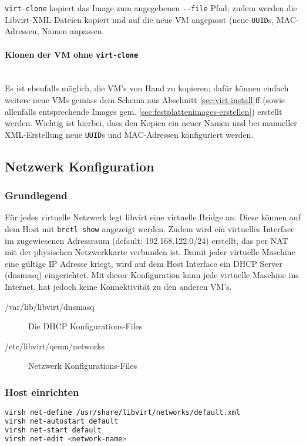 \lstinline|virt-clone| kopiert das Image zum angegebenen \lstinline|--file| Pfad; zudem werden die Libvirt-XML-Dateien kopiert und auf die neue VM angepasst (neue \lstinline|UUID|s, MAC-Adressen, Namen anpassen.

\paragraph{Klonen der VM ohne \lstinline|virt-clone|} \hfill \\
Es ist ebenfalls möglich, die VM's von Hand zu kopieren; dafür können einfach weitere neue VMs gemäss dem Schema aus Abschnitt \ref{sec:virt-install}ff (sowie allenfalls entsprechende Images gem. \ref{sec:festplattenimages-erstellen}) erstellt werden. Wichtig ist hierbei, dass den Kopien ein neuer Namen und bei manueller XML-Erstellung neue \lstinline|UUID|s und MAC-Adressen konfiguriert werden.


\subsection{Netzwerk Konfiguration}


\subsubsection{Grundlegend}
Für jedes virtuelle Netzwerk legt libvirt eine virtuelle Bridge an. Diese können auf dem Host mit \lstinline|brctl show| angezeigt werden. Zudem wird ein virtuelles Interface im zugewiesenen Adressraum (default: 192.168.122.0/24) erstellt, das per NAT mit der physischen Netzwerkkarte verbunden ist. Damit jeder virtuelle Maschine eine gültige IP Adresse kriegt, wird auf dem Host Interface ein DHCP Server (dnsmasq) eingerichtet. Mit dieser Konfiguration kann jede virtuelle Maschine ins Internet, hat jedoch keine Konnektivität zu den anderen VM's. 

\begin{description}
	\item[/var/lib/libvirt/dnsmasq] Die DHCP Konfigurations-Files 
	\item[/etc/libvirt/qemu/networks] Netzwerk Konfigurations-Files
\end{description}

\subsubsection{Host einrichten}
\begin{lstlisting}[language=bash]
virsh net-define /usr/share/libvirt/networks/default.xml
virsh net-autostart default
virsh net-start default
virsh net-edit <network-name>
\end{lstlisting}


